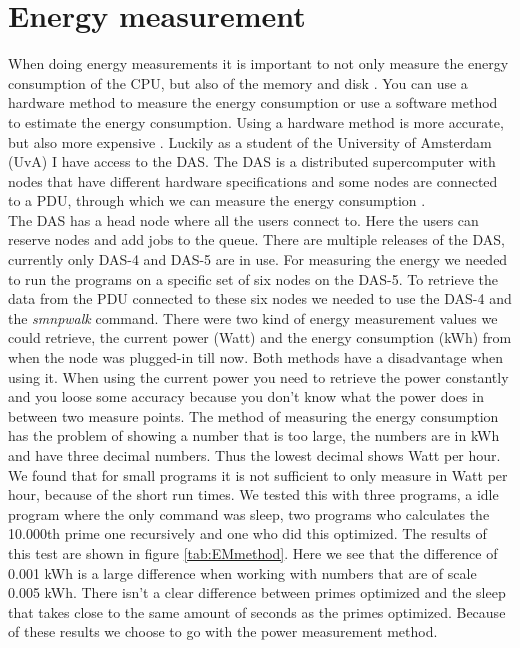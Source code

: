 \chapter{Energy measurement}
\label{ch:energy_measurement}



When doing energy measurements it is important to not only measure the energy consumption of the CPU, but also of the memory and disk \cite{acar2016impact}. You can use a hardware method to measure the energy consumption or use a software method to estimate the energy consumption. Using a hardware method is more accurate, but also more expensive \cite{acar2016impact}. Luckily as a student of the University of Amsterdam (UvA) I have access to the DAS. The DAS is a distributed supercomputer with nodes that have different hardware specifications and some nodes are connected to a PDU, through which we can measure the energy consumption \cite{bal2016medium}.\\

The DAS has a head node where all the users connect to. Here the users can reserve nodes and add jobs to the queue. There are multiple releases of the DAS, currently only DAS-4 and DAS-5 are in use. For measuring the energy we needed to run the programs on a specific set of six nodes on the DAS-5. To retrieve the data from the PDU connected to these six nodes we needed to use the DAS-4 and the \textit{smnpwalk} command. There were two kind of energy measurement values we could retrieve, the current power (Watt) and the energy consumption (kWh) from when the node was plugged-in till now. Both methods have a disadvantage when using it. When using the current power you need to retrieve the power constantly and you loose some accuracy because you don't know what the power does in between two measure points. The method of measuring the energy consumption has the problem of showing a number that is too large, the numbers are in kWh and have three decimal numbers. Thus the lowest decimal shows Watt per hour. We found that for small programs it is not sufficient to only measure in Watt per hour, because of the short run times. We tested this with three programs, a idle program where the only command was sleep, two programs who calculates the 10.000th prime one recursively and one who did this optimized. The results of this test are shown in figure \ref{tab:EMmethod}. Here we see that the difference of 0.001 kWh is a large difference when working with numbers that are of scale 0.005 kWh. There isn't a clear difference between primes optimized and the sleep that takes close to the same amount of seconds as the primes optimized. Because of these results we choose to go with the power measurement method.\\

